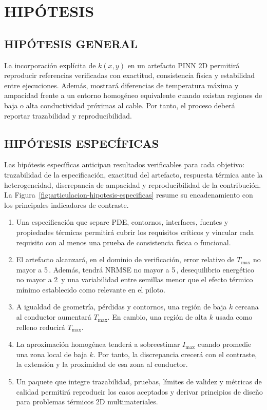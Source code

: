 \documentclass[11pt,a4paper,oneside]{report}
\newcommand{\Tmax}{T_{\max}}
\newcommand{\Imax}{I_{\max}}
\newcommand{\kx}{k(x,y)}
\newcommand{\pct}{\mbox{\char37}}
\begin{document}
\section{HIPÓTESIS}

\subsection{HIPÓTESIS GENERAL}

La incorporación explícita de $\kx$ en un artefacto PINN 2D permitirá reproducir referencias verificadas con exactitud, consistencia física y estabilidad entre ejecuciones. Además, mostrará diferencias de temperatura máxima y ampacidad frente a un entorno homogéneo equivalente cuando existan regiones de baja o alta conductividad próximas al cable. Por tanto, el proceso deberá reportar trazabilidad y reproducibilidad.

\subsection{HIPÓTESIS ESPECÍFICAS}

Las hipótesis específicas anticipan resultados verificables para cada objetivo: trazabilidad de la especificación, exactitud del artefacto, respuesta térmica ante la heterogeneidad, discrepancia de ampacidad y reproducibilidad de la contribución. La Figura~\ref{fig:articulacion-hipotesis-especificas} resume su encadenamiento con los principales indicadores de contraste.

\begin{enumerate}[label=HE\arabic*.]
  \item Una especificación que separe PDE, contornos, interfaces, fuentes y propiedades térmicas permitirá cubrir los requisitos críticos y vincular cada requisito con al menos una prueba de consistencia física o funcional.
  \item El artefacto alcanzará, en el dominio de verificación, error relativo de $\Tmax$ no mayor a 5\,\pct{}. Además, tendrá NRMSE no mayor a 5\,\pct{}, desequilibrio energético no mayor a 2\,\pct{} y una variabilidad entre semillas menor que el efecto térmico mínimo establecido como relevante en el piloto.
  \item A igualdad de geometría, pérdidas y contornos, una región de baja $k$ cercana al conductor aumentará $\Tmax$. En cambio, una región de alta $k$ usada como relleno reducirá $\Tmax$.
  \item La aproximación homogénea tenderá a sobreestimar $\Imax$ cuando promedie una zona local de baja $k$. Por tanto, la discrepancia crecerá con el contraste, la extensión y la proximidad de esa zona al conductor.
  \item Un paquete que integre trazabilidad, pruebas, límites de validez y métricas de calidad permitirá reproducir los casos aceptados y derivar principios de diseño para problemas térmicos 2D multimateriales.
\end{enumerate}
\end{document}
